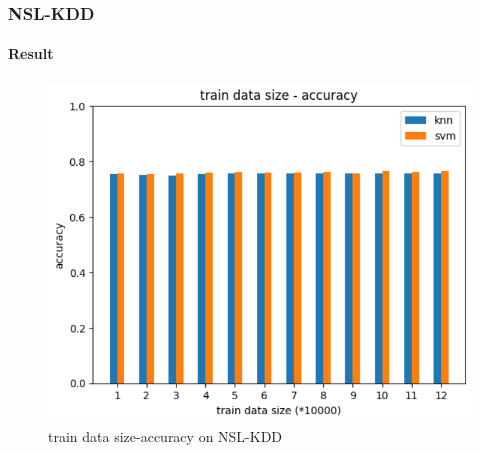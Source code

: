 \documentclass[
	11pt, %
	aspectratio=169, %
]{beamer}
\begin{document}
\begin{frame}
	\frametitle{NSL-KDD}
	\framesubtitle{Result}

	\begin{figure}
		\includegraphics[width=0.5\linewidth]{nsl_kdd_train_size.png}
		\caption{train data size-accuracy on NSL-KDD}
	\end{figure}
\end{frame}
\end{document}
